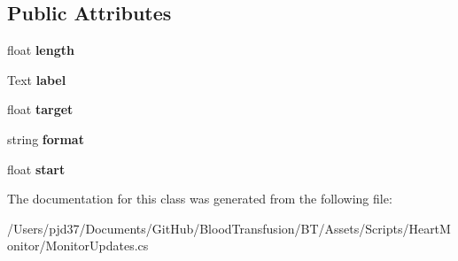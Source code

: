 \subsection*{Public Attributes}
\begin{DoxyCompactItemize}
\item 
float {\bfseries length}\hypertarget{class_monitor_updates_1_1_label_tween_a1af8f9d0fc7740417ff0c24f70828af7}{}\label{class_monitor_updates_1_1_label_tween_a1af8f9d0fc7740417ff0c24f70828af7}

\item 
Text {\bfseries label}\hypertarget{class_monitor_updates_1_1_label_tween_aae6e3e930f67df88d922e53c5410524e}{}\label{class_monitor_updates_1_1_label_tween_aae6e3e930f67df88d922e53c5410524e}

\item 
float {\bfseries target}\hypertarget{class_monitor_updates_1_1_label_tween_a00d6d62568b2051a92cb0a5dbdebfb3d}{}\label{class_monitor_updates_1_1_label_tween_a00d6d62568b2051a92cb0a5dbdebfb3d}

\item 
string {\bfseries format}\hypertarget{class_monitor_updates_1_1_label_tween_a3d88c27a57d39d86664f38067f59a2b3}{}\label{class_monitor_updates_1_1_label_tween_a3d88c27a57d39d86664f38067f59a2b3}

\item 
float {\bfseries start}\hypertarget{class_monitor_updates_1_1_label_tween_a5adb973f2f5b8c8954161212479eed72}{}\label{class_monitor_updates_1_1_label_tween_a5adb973f2f5b8c8954161212479eed72}

\end{DoxyCompactItemize}


The documentation for this class was generated from the following file\+:\begin{DoxyCompactItemize}
\item 
/\+Users/pjd37/\+Documents/\+Git\+Hub/\+Blood\+Transfusion/\+B\+T/\+Assets/\+Scripts/\+Heart\+Monitor/Monitor\+Updates.\+cs\end{DoxyCompactItemize}
